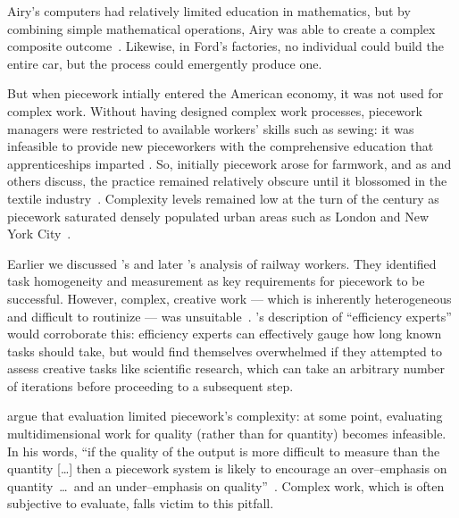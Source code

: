 \documentclass[pn4226]{subfiles}
\begin{document}

Airy's computers had relatively limited education in mathematics, but by combining simple mathematical operations, Airy was able to create a complex composite outcome~\cite{grier2013computers}.
Likewise, in Ford's factories, no individual could build the entire car, but the process could emergently produce one.

But when piecework intially entered the American economy,
it was not used for complex work.
Without having designed complex work processes, piecework managers were restricted to available workers' skills such as sewing: it was infeasible to provide new pieceworkers with the comprehensive education
that apprenticeships imparted \cite{hart2013rise}.
So, initially piecework arose for farmwork, and as
\citeauthor{hughRaynbirdTaskWork} and others discuss,
the practice remained relatively obscure until
it blossomed in the textile industry~\cite{hughRaynbirdTaskWork}.
Complexity levels remained low at the turn of
the  century as piecework saturated densely populated urban areas
such as London and New York City~\cite{riisOtherSideLives}.

Earlier we discussed \citeauthor{10.2307/23702539}'s and later \citeauthor{Brown01041990}'s analysis of railway workers.
They identified task homogeneity and measurement as key requirements for piecework to be successful.
However, complex, creative work
--- which is inherently heterogeneous and difficult to routinize ---
was unsuitable~\cite{10.2307/23702539}.
\citeauthor{Brown01041990}'s description of ``efficiency experts'' would corroborate this:
efficiency experts can effectively gauge how long known tasks should take, but
would find themselves overwhelmed if they attempted to assess creative tasks like scientific research,
which can take an arbitrary number of iterations before proceeding to a subsequent step.


\citeauthor{hart2016rise} argue that evaluation limited piecework's complexity:
at some point, evaluating multidimensional work for quality
(rather than for quantity) becomes infeasible.
In his words,
``if the quality of the output is more difficult to measure than the quantity [\ldots]
then a piecework system is likely to encourage
an over--emphasis on quantity~\dots~and an under--emphasis on quality''~\cite{hart2016rise}.
Complex work, which is often subjective to evaluate, falls victim to this pitfall.
\end{document}
